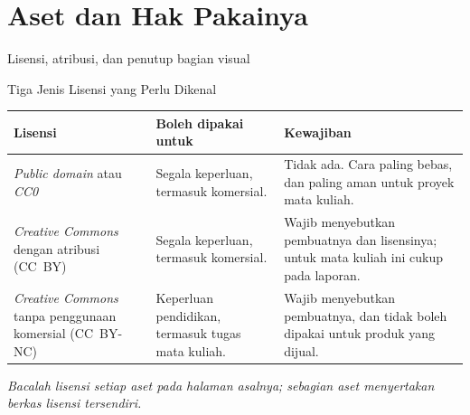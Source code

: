 \documentclass[aspectratio=169,10pt]{beamer}
\begin{document}
\section{Aset dan Hak Pakainya}
  {Lisensi, atribusi, dan penutup bagian visual}

\begin{frame}{Tiga Jenis Lisensi yang Perlu Dikenal}
{\scriptsize
\renewcommand{\arraystretch}{1.14}
\begin{tabularx}{\textwidth}{@{}>{\raggedright\arraybackslash}p{3.3cm}
    >{\raggedright\arraybackslash}p{4.3cm}
    >{\raggedright\arraybackslash}X@{}}
\toprule
\textbf{Lisensi} & \textbf{Boleh dipakai untuk} & \textbf{Kewajiban} \\
\midrule
\emph{Public domain} atau \emph{CC0} &
  Segala keperluan, termasuk komersial. &
  Tidak ada. Cara paling bebas, dan paling aman untuk proyek mata kuliah. \\
\addlinespace
\emph{Creative Commons} dengan atribusi (CC~BY) &
  Segala keperluan, termasuk komersial. &
  Wajib menyebutkan pembuatnya dan lisensinya; untuk mata kuliah ini cukup
  pada laporan. \\
\addlinespace
\emph{Creative Commons} tanpa penggunaan komersial (CC~BY-NC) &
  Keperluan pendidikan, termasuk tugas mata kuliah. &
  Wajib menyebutkan pembuatnya, dan tidak boleh dipakai untuk produk yang
  dijual. \\
\bottomrule
\end{tabularx}}
\vspace{0.08cm}
{\footnotesize\color{ubMuted}\itshape Bacalah lisensi setiap aset pada halaman
asalnya; sebagian aset menyertakan berkas lisensi tersendiri.}
\end{frame}
\end{document}
